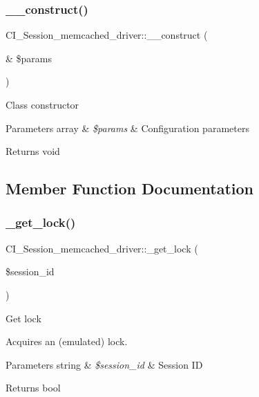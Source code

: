 \subsubsection{\texorpdfstring{\+\_\+\+\_\+construct()}{\_\_construct()}}
{\footnotesize\ttfamily C\+I\+\_\+\+Session\+\_\+memcached\+\_\+driver\+::\+\_\+\+\_\+construct (\begin{DoxyParamCaption}\item[{\&}]{\$params }\end{DoxyParamCaption})}

Class constructor


\begin{DoxyParams}[1]{Parameters}
array & {\em \$params} & Configuration parameters \\
\hline
\end{DoxyParams}
\begin{DoxyReturn}{Returns}
void 
\end{DoxyReturn}


\subsection{Member Function Documentation}
\mbox{\label{class_c_i___session__memcached__driver_aad9816a84df6ffb91a5f6bc81eb2e0e0}} 
\subsubsection{\texorpdfstring{\+\_\+get\+\_\+lock()}{\_get\_lock()}}
{\footnotesize\ttfamily C\+I\+\_\+\+Session\+\_\+memcached\+\_\+driver\+::\+\_\+get\+\_\+lock (\begin{DoxyParamCaption}\item[{}]{\$session\+\_\+id }\end{DoxyParamCaption})\hspace{0.3cm}{\ttfamily [protected]}}

Get lock

Acquires an (emulated) lock.


\begin{DoxyParams}[1]{Parameters}
string & {\em \$session\+\_\+id} & Session ID \\
\hline
\end{DoxyParams}
\begin{DoxyReturn}{Returns}
bool 
\end{DoxyReturn}
\mbox{\label{class_c_i___session__memcached__driver_aab30d34660f3c28ae03e6678a8b3a740}} 
